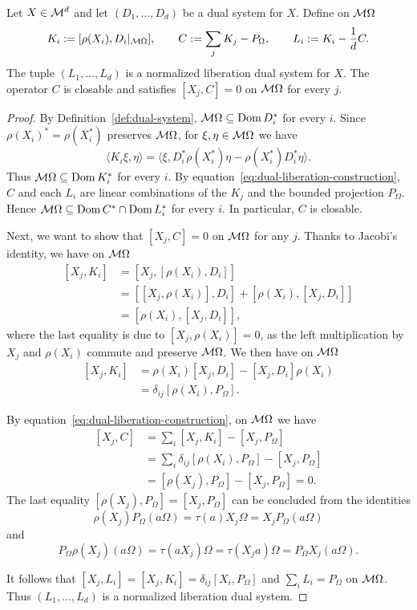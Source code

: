 \begin{proposition}\label{prop:dual-liberation-construction}
Let $X\in\mathcal M^d$ and let $(D_1,\ldots,D_d)$ be a dual system for $X$.
Define on $\mathcal M\Omega$
\begin{equation}\label{eq:dual-liberation-construction}
 K_i:=[\rho(X_i),D_i|_{\mathcal M\Omega}],\qquad
 C:=\sum_jK_j-P_\Omega,\qquad
 L_i:=K_i-\frac1d C.
\end{equation}
The tuple $(L_1,\ldots,L_d)$ is a normalized liberation dual system for $X$.
The operator $C$ is closable and satisfies $[X_j,C]=0$ on $\mathcal M\Omega$ for every $j$.
\end{proposition}
\begin{proof}
By Definition~\ref{def:dual-system}, $\mathcal M\Omega\subseteq\operatorname{Dom} D_i^*$ for every $i$.
Since $\rho(X_i)^*=\rho(X_i^*)$ preserves $\mathcal M\Omega$, for $\xi,\eta\in\mathcal M\Omega$ we have
\[
 \langle K_i\xi,\eta\rangle
 =\big\langle \xi,D_i^*\rho(X_i^*)\eta-\rho(X_i^*)D_i^*\eta\big\rangle.
\]
Thus $\mathcal M\Omega\subseteq\operatorname{Dom} K_i^*$ for every $i$.
By equation~\eqref{eq:dual-liberation-construction}, $C$ and each $L_i$ are linear combinations of the $K_j$ and the bounded projection $P_\Omega$.
Hence $\mathcal M\Omega\subseteq\operatorname{Dom} C^*\cap\operatorname{Dom} L_i^*$ for every $i$.
In particular, $C$ is closable.

Next, we want to show that $[X_j,C]=0$ on $\mathcal M\Omega$ for any $j$.
Thanks to Jacobi's identity, we have on $\mathcal M\Omega$
\[
 \begin{aligned}
  [X_j,K_i]
  &=[X_j,[\rho(X_i),D_i]]\\
  &=[[X_j,\rho(X_i)],D_i]+[\rho(X_i),[X_j,D_i]]\\
  &=[\rho(X_i),[X_j,D_i]],
 \end{aligned}
\]
where the last equality is due to $[X_j,\rho(X_i)]=0$, as the left multiplication by $X_j$ and $\rho(X_i)$ commute and preserve $\mathcal M\Omega$.
We then have on $\mathcal M\Omega$
\[
 \begin{aligned}
  [X_j,K_i]
  &=\rho(X_i)[X_j,D_i]-[X_j,D_i]\rho(X_i)\\
  &=\delta_{ij}[\rho(X_i),P_\Omega].
 \end{aligned}
\]

By equation~\eqref{eq:dual-liberation-construction}, on $\mathcal M\Omega$ we have
\[
 \begin{aligned}
  [X_j,C]
  &=\sum_i[X_j,K_i]-[X_j,P_\Omega]\\
  &=\sum_i\delta_{ij}[\rho(X_i),P_\Omega]-[X_j,P_\Omega]\\
  &=[\rho(X_j),P_\Omega]-[X_j,P_\Omega]=0.
 \end{aligned}
\]
The last equality $[\rho(X_j),P_\Omega]=[X_j,P_\Omega]$ can be concluded from the identities
\[
 \rho(X_j)P_\Omega(a\Omega)=\tau(a)X_j\Omega=X_jP_\Omega(a\Omega)
\]
and
\[
 P_\Omega\rho(X_j)(a\Omega)=\tau(aX_j)\Omega
 =\tau(X_j a)\Omega=P_\Omega X_j(a\Omega).
\]

It follows that $[X_j,L_i]=[X_j,K_i]=\delta_{ij}[X_i,P_\Omega]$ and $\sum_iL_i=P_\Omega$ on $\mathcal M\Omega$.
Thus $(L_1,\ldots,L_d)$ is a normalized liberation dual system.
\end{proof}

